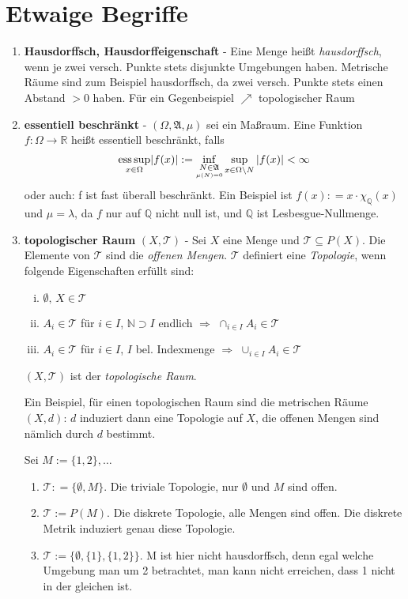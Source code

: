 \documentclass[ngerman]{report}
\theoremstyle{plain}%
\theoremstyle{definition}%
\theoremstyle{myStyle}
\newcommand{\R}{\mathbb{R}}
\newcommand{\Q}{\mathbb{Q}}
\newcommand{\N}{\mathbb{N}}
\newcommand{\hA}{\mathfrak{A}}%
\newcommand{\tT}{\mathcal{T}} %
\newcommand{\ess}{\textnormal{ess}}
\newcommand{\df}[1][]{%
	\overset{#1}{\Rightarrow}
}
\begin{document}
\chapter{Etwaige Begriffe}
	\begin{enumerate}
		\item \textbf{Hausdorffsch, Hausdorffeigenschaft} - Eine Menge heißt \textit{hausdorffsch}, wenn je zwei versch. Punkte stets disjunkte Umgebungen haben. Metrische Räume sind zum Beispiel hausdorffsch, da zwei versch. Punkte stets einen Abstand $> 0$ haben. Für ein Gegenbeispiel $\nearrow$ topologischer Raum

		\item \textbf{essentiell beschränkt} - 
					$(\Omega, \hA,\mu)$ sei ein Maßraum. Eine Funktion $f: \Omega \rightarrow \R$ heißt essentiell beschränkt, falls 
					$$\underset{x\in\Omega}{\ess \sup} |f(x)| := {\inf_{\underset{\mu(N)=0}{N \in \hA}} }  
					\sup_{x\in \Omega\backslash N} |f(x)| < \infty$$
					oder auch: f ist fast überall beschränkt. 
					Ein Beispiel ist $f(x) : = x\cdot \chi_\Q(x)$ und $\mu = \lambda$, da $f$ nur auf $\Q$ nicht null ist, und $\Q$ ist Lesbesgue-Nullmenge. 

		\item \textbf{topologischer Raum} $(X,\tT)$ - Sei $X$ eine Menge und $\tT\subseteq P(X)$. Die Elemente von $\tT$ sind die \textit{offenen Mengen}. $\tT$ definiert eine \textit{Topologie}, wenn folgende Eigenschaften erfüllt sind:
	\begin{enumerate}[(i)]
	\item $\emptyset,\,X\in \tT$

\item $A_i\in\tT$ für $i\in I$, $\N \supset I$ endlich $\df$ $\cap_{i\in I} A_i\in\tT$

\item $A_i\in\tT$ für $i\in I$, $I$ bel. Indexmenge $\df$ $\cup_{i\in I}A_i \in \tT$
\end{enumerate}
	$(X,\tT)$ ist der \textit{topologische Raum}.\par
Ein Beispiel, für einen topologischen Raum sind die metrischen Räume $(X,d)$: $d$ induziert dann eine Topologie auf $X$, die offenen Mengen sind nämlich durch $d$ bestimmt.\par
Sei $M:=\{1,2\},\dots$
\begin{enumerate}[]
\item $\tT: = \{\emptyset,M\}$. Die triviale Topologie, nur $\emptyset$ und $M$ sind offen.

\item $\tT:=P(M)$. Die diskrete Topologie, alle Mengen sind offen. Die diskrete Metrik induziert genau diese Topologie.

\item $\tT:=\{\emptyset,\{1\},\{1,2\}\}.$ M ist hier nicht hausdorffsch, denn egal welche Umgebung man um 2 betrachtet, man kann nicht erreichen, dass 1 nicht in der gleichen ist.
\end{enumerate}
			
	\end{enumerate} 
\end{document}
